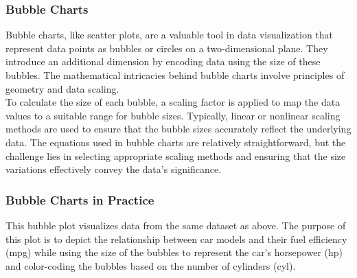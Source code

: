 \documentclass{article}\usepackage[]{graphicx}\usepackage[]{xcolor}
\begin{document}
\subsubsection{Bubble Charts}
Bubble charts, like scatter plots, are a valuable tool in data visualization that represent data points as bubbles or circles on a two-dimensional plane. They introduce an additional dimension by encoding data using the size of these bubbles. The mathematical intricacies behind bubble charts involve principles of geometry and data scaling.\\
To calculate the size of each bubble, a scaling factor is applied to map the data values to a suitable range for bubble sizes. Typically, linear or nonlinear scaling methods are used to ensure that the bubble sizes accurately reflect the underlying data. The equations used in bubble charts are relatively straightforward, but the challenge lies in selecting appropriate scaling methods and ensuring that the size variations effectively convey the data's significance. 

\subsubsection{Bubble Charts in Practice}
 This bubble plot visualizes data from the same dataset as above. The purpose of this plot is to depict the relationship between car models and their fuel efficiency (mpg) while using the size of the bubbles to represent the car's horsepower (hp) and color-coding the bubbles based on the number of cylinders (cyl).
\end{document}
